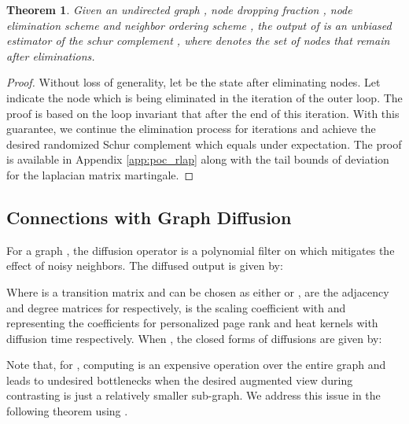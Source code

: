 \documentclass{article}
\theoremstyle{plain}
\newtheorem{theorem}{Theorem}[section]
\theoremstyle{definition}
\theoremstyle{remark}
\begin{document}
\begin{theorem}
\label{thm:rlap}
Given an undirected graph , node dropping fraction , node elimination scheme  and neighbor ordering scheme , the output of  is an unbiased estimator of the schur complement , where  denotes the set of nodes that remain after  eliminations.
\end{theorem}
\begin{proof} Without loss of generality, let  be the state after eliminating  nodes. Let  indicate the node which is being eliminated in the  iteration of the outer loop. The proof is based on the loop invariant that  after the end of this iteration. With this guarantee, we continue the elimination process for  iterations and achieve the desired randomized Schur complement which equals  under expectation.  The proof is available in Appendix \ref{app:poc_rlap} along with the tail bounds of deviation for the laplacian matrix martingale.
\end{proof}



\subsection{Connections with Graph Diffusion}

For a graph , the diffusion operator is a polynomial filter on  which mitigates the effect of noisy neighbors. The diffused output  is given by:

Where  is a transition matrix \citep{klicpera2019diffusion} and can be chosen as either  or ,  are the adjacency and degree matrices for  respectively,   is the scaling coefficient with  and  representing the coefficients for personalized page rank \citep{page1999pagerank} and heat kernels with diffusion time  \citep{kondor2002diffusion, chung2007heat} respectively. When , the closed forms of diffusions are given by:



Note that, for , computing  is an expensive operation over the entire graph and leads to undesired bottlenecks when the desired augmented view during contrasting is just a relatively smaller sub-graph. We address this issue in the following theorem using .
\end{document}
